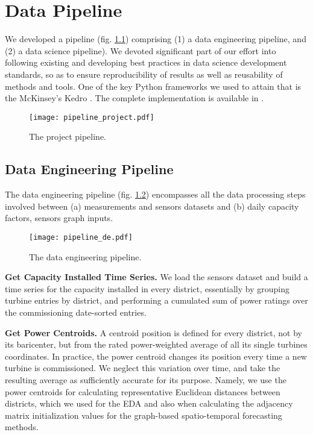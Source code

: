 \graphicspath{{./figures/pipeline/}}

\chapter{Data Pipeline}
We developed a pipeline (fig. \ref{fig:project_pipeline}) comprising (1) a data engineering pipeline, and (2) a data science pipeline).
We devoted significant part of our effort into following existing and developing best practices in data science development standards, so as to ensure reproducibility of results as well as reusability of methods and tools.
One of the key Python frameworks we used to attain that is the McKinsey's Kedro \cite{kedro}.
The complete implementation is available in \cite{windstfgithub}.

\begin{figure}[H]
	\centering
    \caption{The project pipeline.}
    \texttt{[image: pipeline\_project.pdf]}
	\label{fig:project_pipeline}
\end{figure}


\section{Data Engineering Pipeline}
The data engineering pipeline (fig. \ref{fig:pipeline_de}) encompasses all the data processing steps involved between (a) measurements and sensors datasets and (b) daily capacity factors, sensors graph inputs.

\begin{figure}[H]
	\centering
    \caption{The data engineering pipeline.}
    \texttt{[image: pipeline\_de.pdf]}
	\label{fig:pipeline_de}
\end{figure}

\vspace{1em}
\noindent
\textbf{Get Capacity Installed Time Series.}  We load the sensors dataset and build a time series for the capacity installed in every district, essentially by grouping  turbine entries by district, and performing a cumulated sum of power ratings over the commissioning date-sorted entries.

\vspace{1em}
\noindent
\textbf{Get Power Centroids.}  A centroid position is defined for every district, not by its baricenter, but from the rated power-weighted average of all its single turbines coordinates. In practice, the power centroid changes its position every time  a new turbine is commissioned. We neglect this variation over time, and take the resulting average as sufficiently accurate for its purpose. Namely, we use the power centroids for calculating representative Euclidean distances between districts, which we used for the EDA and also when calculating the adjacency matrix initialization values for the graph-based spatio-temporal forecasting methods.

